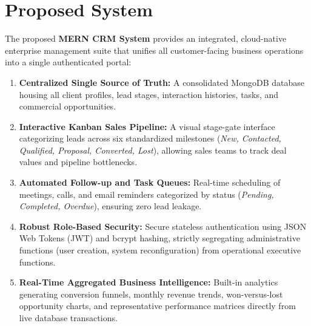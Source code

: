 \section{Proposed System}
The proposed \textbf{MERN CRM System} provides an integrated, cloud-native enterprise management suite that unifies all customer-facing business operations into a single authenticated portal:
\begin{enumerate}
    \item \textbf{Centralized Single Source of Truth:} A consolidated MongoDB database housing all client profiles, lead stages, interaction histories, tasks, and commercial opportunities.
    \item \textbf{Interactive Kanban Sales Pipeline:} A visual stage-gate interface categorizing leads across six standardized milestones (\textit{New, Contacted, Qualified, Proposal, Converted, Lost}), allowing sales teams to track deal values and pipeline bottlenecks.
    \item \textbf{Automated Follow-up and Task Queues:} Real-time scheduling of meetings, calls, and email reminders categorized by status (\textit{Pending, Completed, Overdue}), ensuring zero lead leakage.
    \item \textbf{Robust Role-Based Security:} Secure stateless authentication using JSON Web Tokens (JWT) and bcrypt hashing, strictly segregating administrative functions (user creation, system reconfiguration) from operational executive functions.
    \item \textbf{Real-Time Aggregated Business Intelligence:} Built-in analytics generating conversion funnels, monthly revenue trends, won-versus-lost opportunity charts, and representative performance matrices directly from live database transactions.
\end{enumerate}

